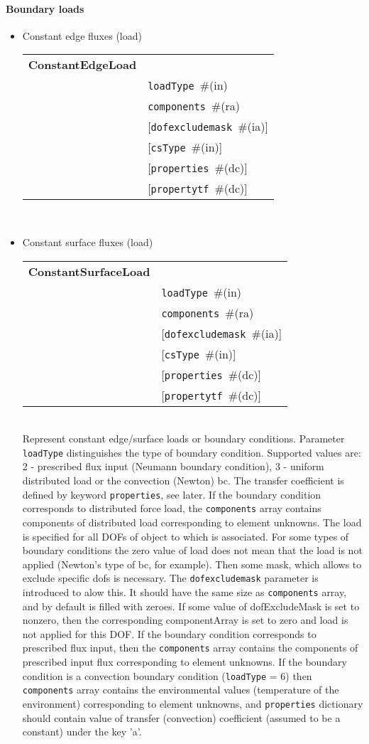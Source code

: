 \documentclass[a4paper]{article}
\makeatletter
\newcommand{\param}[1]{\texttt{#1}} %
\newcommand{\optional}[1]{[#1]} %
\newcommand{\field}[2]{\param{#1}~\#{\tiny(#2)}} %
\newcommand{\optField}[2]{\optional{\field{#1}{#2}}}
\newcommand{\entKeywordInst}[1]{\textbf{#1}} %
\newenvironment{record}[1][]{\begin{tabular}{|ll}}{\end{tabular}\\}
\newcommand{\recentry}[2]{{#1}&{#2}\\}
\newcounter{rcc}
\newenvironment{record}[1][\textwidth]{\setcounter{rcc}{0}\begin{tabular*}{#1}{|ll@{\extracolsep{\fill}}r}}{\end{tabular*}\\}
\newcommand{\recentry}[2]{\ifthenelse{\value{rcc}>0}{&$\backslash$ \\}{\setcounter{rcc}{1}}{#1}&{#2}}
\makeatother
\begin{document}
\paragraph{Boundary loads}
\begin{itemize}
\item Constant edge fluxes (load)

\begin{record}[0.9\textwidth]
  \recentry{\entKeywordInst{ConstantEdgeLoad}}{}
  \recentry{}{\field{loadType}{in}}
  \recentry{}{\field{components}{ra}}
  \recentry{}{\optField{dofexcludemask}{ia}}
  \recentry{}{\optField{csType}{in}}
  \recentry{}{\optField{properties}{dc}}
  \recentry{}{\optField{propertytf}{dc}}
\end{record}
\item Constant surface fluxes (load)

\begin{record}[0.9\textwidth]
  \recentry{\entKeywordInst{ConstantSurfaceLoad}}{}
  \recentry{}{\field{loadType}{in}}
  \recentry{}{\field{components}{ra}}
  \recentry{}{\optField{dofexcludemask}{ia}}
  \recentry{}{\optField{csType}{in}}
  \recentry{}{\optField{properties}{dc}}
  \recentry{}{\optField{propertytf}{dc}}
\end{record}
Represent constant edge/surface loads or boundary conditions.
Parameter \param{loadType} distinguishes the type of boundary condition. Supported values are:
2 - prescribed flux input (Neumann boundary condition), 3 - uniform distributed load or the convection (Newton) bc.
The transfer coefficient is defined by keyword \param{properties}, see later.
If the boundary condition corresponds to distributed force load, the \param{components} array contains components of distributed load corresponding to element unknowns.
The load is specified for all DOFs of object to which is associated.
For some types of boundary conditions the zero value of load does not mean that the load is not applied (Newton's type of bc, for example).
Then some mask, which allows to exclude specific dofs is necessary.
The \param{dofexcludemask} parameter is introduced to alow this.
It should have the same size as \param{components} array, and by
default is filled with zeroes. If some value of dofExcludeMask is set
to nonzero, then the corresponding componentArray
is set to zero and load is not applied for this DOF.
If the boundary condition corresponds to prescribed flux input, then
the \param{components} array contains the components of prescribed
input flux corresponding to element unknowns.
If the boundary condition is a convection boundary condition
(\param{loadType} = 6) then \param{components} array contains the
environmental values (temperature of the environment) corresponding to
element unknowns, and \param{properties} dictionary should contain
value of transfer (convection) coefficient (assumed to be a constant) under the key 'a'.


\end{itemize}
\end{document}
